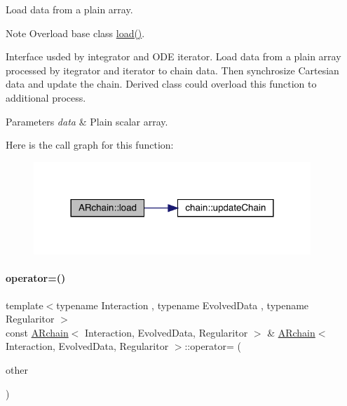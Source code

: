 Load data from a plain array. 

\begin{DoxyNote}{Note}
Overload base class \mbox{\hyperlink{class_a_rchain_a7edf1240a094d55df222c816659dced0}{load()}}.
\end{DoxyNote}
Interface usded by integrator and O\+DE iterator. Load data from a plain array processed by itegrator and iterator to chain data. Then synchrosize Cartesian data and update the chain. Derived class could overload this function to additional process.


\begin{DoxyParams}{Parameters}
{\em data} & Plain scalar array. \\
\hline
\end{DoxyParams}
Here is the call graph for this function\+:\nopagebreak
\begin{figure}[H]
\begin{center}
\leavevmode
\includegraphics[width=296pt]{class_a_rchain_a7edf1240a094d55df222c816659dced0_cgraph}
\end{center}
\end{figure}
\mbox{\label{class_a_rchain_a7bcc783f99cad1e9113d2b505544aba1}} 
\paragraph{\texorpdfstring{operator=()}{operator=()}}
{\footnotesize\ttfamily template$<$typename Interaction , typename Evolved\+Data , typename Regularitor $>$ \\
const \mbox{\hyperlink{class_a_rchain}{A\+Rchain}}$<$ Interaction, Evolved\+Data, Regularitor $>$ \& \mbox{\hyperlink{class_a_rchain}{A\+Rchain}}$<$ Interaction, Evolved\+Data, Regularitor $>$\+::operator= (\begin{DoxyParamCaption}\item[{const \mbox{\hyperlink{class_a_rchain}{A\+Rchain}}$<$ Interaction, Evolved\+Data, Regularitor $>$ \&}]{other }\end{DoxyParamCaption})}




